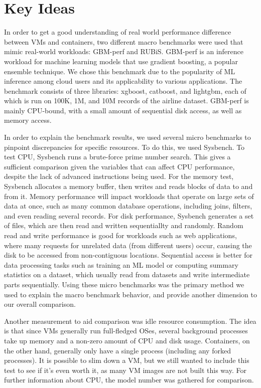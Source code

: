 \documentclass[11pt]{article}
\begin{document}
\section{Key Ideas}

In order to get a good understanding of real world performance difference between VMs and containers, two different macro benchmarks were used that mimic real-world workloads: GBM-perf and RUBiS. GBM-perf is an inference workload for machine learning models that use gradient boosting, a popular ensemble technique. We chose this benchmark due to the popularity of ML inference among cloud users and its applicability to various applications. The benchmark consists of three libraries: xgboost, catboost, and lightgbm, each of which is run on 100K, 1M, and 10M records of the airline dataset. GBM-perf is mainly CPU-bound, with a small amount of sequential disk access, as well as memory access.

In order to explain the benchmark results, we used several micro benchmarks to pinpoint discrepancies for specific resources. To do this, we used Sysbench. To test CPU, Sysbench runs a brute-force prime number search. This gives a sufficient comparison given the variables that can affect CPU performance, despite the lack of advanced instructions being used. For the memory test, Sysbench allocates a memory buffer, then writes and reads blocks of data to and from it. Memory performance will impact workloads that operate on large sets of data at once, such as many common database operations, including joins, filters, and even reading several records. For disk performance, Sysbench generates a set of files, which are then read and written sequentiallty and randomly. Random read and write performance is good for workloads such as web applications, where many requests for unrelated data (from different users) occur, causing the disk to be accessed from non-contiguous locations. Sequential access is better for data processing tasks such as training an ML model or computing summary statistics on a dataset, which usually read from datasets and write intermediate parts sequentially. Using these micro benchmarks was the primary method we used to explain the macro benchmark behavior, and provide another dimension to our overall comparison.

Another measurement to aid comparison was idle resource consumption. The idea is that since VMs generally run full-fledged OSes, several background processes take up memory and a non-zero amount of CPU and disk usage. Containers, on the other hand, generally only have a single process (including any forked processes). It is possible to slim down a VM, but we still wanted to include this test to see if it's even worth it, as many VM images are not built this way. For further information about CPU, the model number was gathered for comparison.
\end{document}
